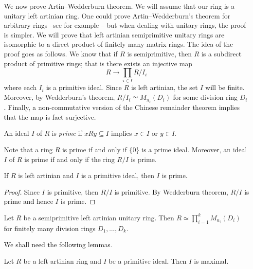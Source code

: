 We now prove Artin--Wedderburn theorem. We will assume that our ring
is a unitary left artinian ring. One could prove
Artin--Wedderburn's theorem for arbitrary rings --see for example \cite{MR600654}--  
but when dealing with unitary rings, the proof 
is simpler. We will prove
that left artinian semiprimitive unitary rings
are isomorphic to a direct product
of finitely many matrix rings. The idea of the proof goes as follows. 
We know that if 
$R$ is semiprimitive, then $R$ is a subdirect product
of primitive rings; that is  
there exists an injective map
\[
R\to \prod_{i\in I}R/I_i
\]
where each $I_i$ is a primitive ideal. Since $R$ is left artinian, 
the set $I$ will be finite. Moreover, 
by Wedderburn's theorem, 
$R/I_i\simeq M_{n_i}(D_i)$ for some division ring $D_i$. Finally,
a non-commutative version of the Chinese remainder theorem
implies that the map is fact surjective. 

\begin{definition}
    An ideal $I$ of $R$ is \emph{prime} if $xRy\subseteq I$ implies
    $x\in I$ or $y\in I$.
\end{definition}

Note that a ring $R$ is prime if and only if $\{0\}$ is a prime ideal. 
Moreover, 
an ideal $I$ of $R$ is prime if and only if 
the ring $R/I$ is prime. 

\begin{lemma}
    If $R$ is left artinian and $I$ is a primitive ideal, then
    $I$ is prime. 
\end{lemma}


\begin{proof}
    Since $I$ is primitive, then $R/I$ is primitive. By Wedderburn theorem, 
    $R/I$ is prime and hence $I$ is prime. 
\end{proof}

\begin{theorem}
\label{thm:ArtinWedderburn_version2}
    Let $R$ be a semiprimitive left artinian unitary ring. Then
    $R\simeq\prod_{i=1}^kM_{n_i}(D_i)$ for finitely many
    division rings $D_1,\dots,D_k$. 
\end{theorem}

We shall need the following lemmas.

\begin{lemma}
\label{lem:primitive=>maximal}
    Let $R$ be a left artinian ring and $I$ be a primitive ideal. 
    Then $I$ is maximal. 
\end{lemma}

